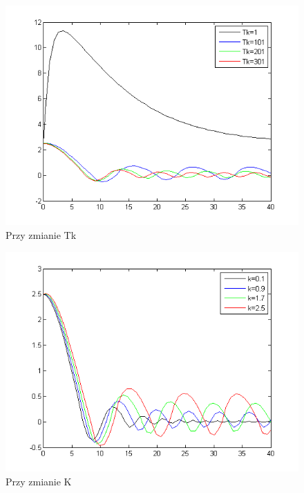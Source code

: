 \documentclass[a4paper,10pt]{article}
\begin{document}
\begin{enumerate}
\begin{figure}[!h]
    \centering
	\includegraphics[width=120mm]{CW3-korekcja-trojpolozeniowyBH-e_Tk.png}
	\caption{Przy zmianie Tk}
    \label{fig:Rysunek}
\end{figure}

\begin{figure}[!h]
    \centering
	\includegraphics[width=120mm]{CW3-korekcja-trojpolozeniowyBH-e_k.png}
	\caption{Przy zmianie K}
    \label{fig:Rysunek}
\end{figure}


\end{enumerate}
\end{document}
